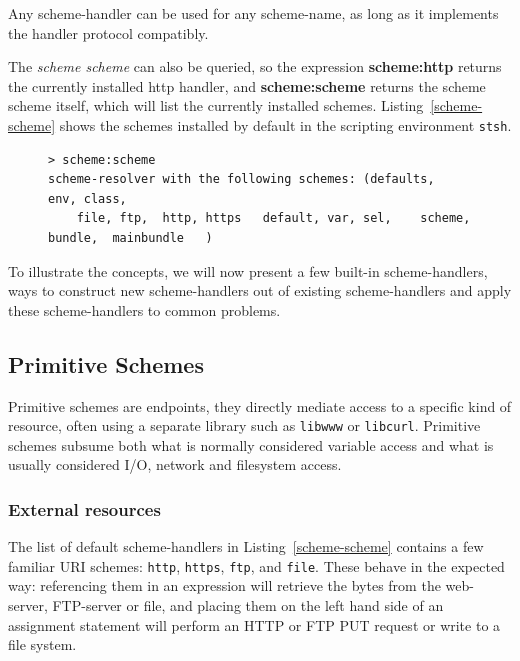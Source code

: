 \documentclass[preprint]{sigplanconf}
\begin{document}
\fussy

 Any scheme-handler
can be used for any scheme-name, as long as it implements the handler protocol
compatibly.


The \emph{scheme scheme} can also be queried,
so the expression {\bf scheme:http} returns the currently installed http handler, and 
{\bf scheme:scheme} returns the scheme scheme itself, which will list the currently
installed schemes.  Listing~\ref{scheme-scheme} shows the schemes installed by
default in the scripting environment {\tt stsh}.

\vspace{-0.5em}
\begin{figure}[htbp]
\begin{lstlisting}[style=numbers,label=scheme-scheme,caption=List of schemes via scheme:scheme.]
> scheme:scheme 
scheme-resolver with the following schemes: (defaults,  env, class,
    file, ftp,  http, https   default, var, sel,    scheme,    bundle,  mainbundle   )
\end{lstlisting}
\end{figure}
\vspace{-0.5em}

To illustrate the concepts, we will now present a few built-in scheme-handlers, ways to construct new
scheme-handlers out of existing scheme-handlers and apply these scheme-handlers to common
problems.

\subsection{Primitive Schemes}
\label{primitiveSchemes}

Primitive schemes are endpoints, they directly
mediate access to a specific kind of resource, often using a separate
library such as {\tt libwww} or {\tt libcurl}.  Primitive schemes
subsume both what is normally considered variable access and 
what is usually considered I/O, network and filesystem access.


\subsubsection{External resources}
\label{externalResources}

The list of default scheme-handlers in Listing~\ref{scheme-scheme} contains a few familiar URI schemes:
{\tt http}, {\tt https}, {\tt ftp}, and {\tt file}.   These behave in the expected way:   referencing them in an expression will
retrieve the bytes from the web-server, FTP-server or file, and placing them on the left hand side of
an assignment statement will perform an HTTP or FTP PUT request or write to a file system. 
 
\end{document}
